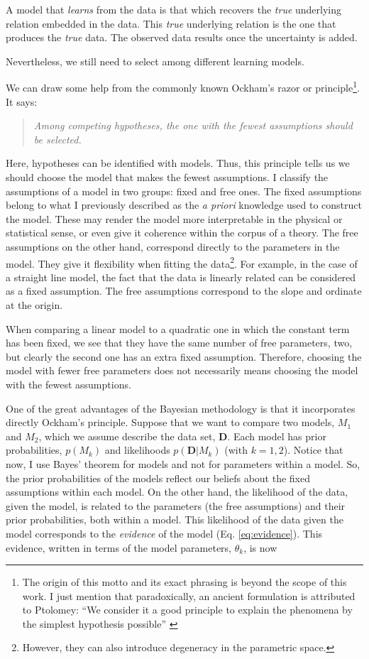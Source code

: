 A model that \emph{learns} from the data is that which recovers the \emph{true} underlying relation embedded in the data. This \emph{true} underlying relation is the one that produces the \emph{true} data. The observed data results once the uncertainty is added. 

Nevertheless, we still need to select among different learning models.  

We can draw some help from the commonly known Ockham's razor or principle\footnote{The origin of this motto and its exact phrasing is beyond the scope of this work. I just mention that paradoxically, an ancient formulation is attributed to Ptolomey: ``We consider it a good principle to explain the phenomena by the simplest hypothesis possible'' \citep{Franklin2002}}. It says:
\begin{quotation}
\textit{Among competing hypotheses, the one with the fewest assumptions should be selected.}
\end{quotation}

Here, hypotheses can be identified with models. Thus, this principle tells us we should choose the model that makes the fewest assumptions. I classify the assumptions of a model in two groups: fixed and free ones. The fixed assumptions belong to what I previously described as the \emph{a priori} knowledge used to construct the model. These may render the model more interpretable in the physical or statistical sense, or even give it coherence within the corpus of a theory. The free assumptions on the other hand, correspond directly to the parameters in the model. They give it flexibility when fitting the data\footnote{However, they can also introduce degeneracy in the parametric space.}. For example, in the case of a straight line model, the fact that the data is linearly related can be considered as a fixed assumption. The free assumptions correspond to the slope and ordinate at the origin. 

When comparing a linear model to a quadratic one in which the constant term has been fixed, we see that they have the same number of free parameters, two, but clearly the second one has an extra fixed assumption. Therefore, choosing the model with fewer free parameters does not necessarily means choosing the model with the fewest assumptions.

One of the great advantages of the Bayesian methodology is that it incorporates directly Ockham's principle. Suppose that we want to compare two models, $M_1$ and $M_2$, which we assume describe the data set, $\mathbf{D}$. Each model has prior probabilities, $p(M_k)$ and likelihoods $p(\mathbf{D}|M_k)$ (with $k=1,2$). Notice that now, I use Bayes' theorem for models and not for parameters within a model. So, the prior probabilities of the models reflect our beliefs about the fixed assumptions within each model. On the other hand, the likelihood of the data, given the model, is related to the parameters (the free assumptions) and their prior probabilities, both within a model. This likelihood of the data given the model corresponds to the \emph{evidence} of the model (Eq. \ref{eq:evidence}). This evidence, written in terms of the model parameters, $\theta_k$, is now

